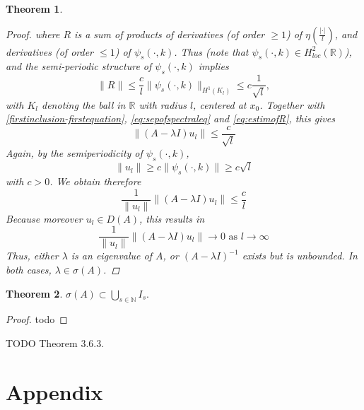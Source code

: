 \documentclass[fontsize=14pt,a4paper,DIV=1]{scrartcl}
\newtheorem{theorem}{Theorem}[section]
\numberwithin{equation}{section}
\newcommand{\R}{\mathbb{R}}
\newcommand{\N}{\mathbb{N}}
\begin{document}
\begin{theorem}
\begin{proof}
		where $R$ is a sum of products of derivatives (of order $\geq 1$) of $\eta(\frac{|\cdot|}{l})$, and derivatives (of order $\leq 1$) of $\psi_{s}(\cdot, k)$. Thus (note that $\psi_{s}(\cdot, k) \in H^{2}_{loc}(\R)$), and the semi-periodic structure of $\psi_{s}(\cdot, k)$ implies
		\begin{equation}
			 \| R \| \leq \frac{c}{l} \| \psi_{s}(\cdot, k) \|_{H^{1}(K_{l})} \leq c \frac{1}{\sqrt{l}}, \label{eq:estimofR}
		\end{equation}
		with $K_{l}$ denoting the ball in $\R$ with radius $l$, centered at $x_{0}$. Together with \eqref{firstinclusion-firstequation}, \eqref{eq:sepofspectraleq} and \eqref{eq:estimofR}, this gives
		\[ \| (A - \lambda I) u_{l} \| \leq \frac{c}{\sqrt{l}} \]
		Again, by the semiperiodicity of $\psi_{s}(\cdot, k)$,
		\[ \| u_{l} \| \geq c \| \psi_{s}(\cdot, k) \| \geq c \sqrt{l} \]
		with $c > 0$. We obtain therefore
		\[ \frac{1}{\|u_{l}\|}\| (A - \lambda I) u_{l} \| \leq \frac{c}{l} \]
		Because moreover $u_{l} \in D(A)$, this results in
			\[ \frac{1}{\|u_{l} \|} \| (A - \lambda I) u_{l} \| \rightarrow 0 \text{ as } l \rightarrow \infty \]
		Thus, either $\lambda$ is an eigenvalue of $A$, or $(A - \lambda I)^{-1}$ exists but is unbounded. In both cases, $\lambda \in \sigma(A)$.
	\end{proof}
\end{theorem}	
	
\begin{theorem}
	$\sigma(A) \subset \bigcup_{s \in \N} I_{s}.$
\end{theorem}
\begin{proof}
	todo
\end{proof}
	
TODO 
	Theorem 3.6.3.
	
\newpage

\section{Appendix}
\end{document}
